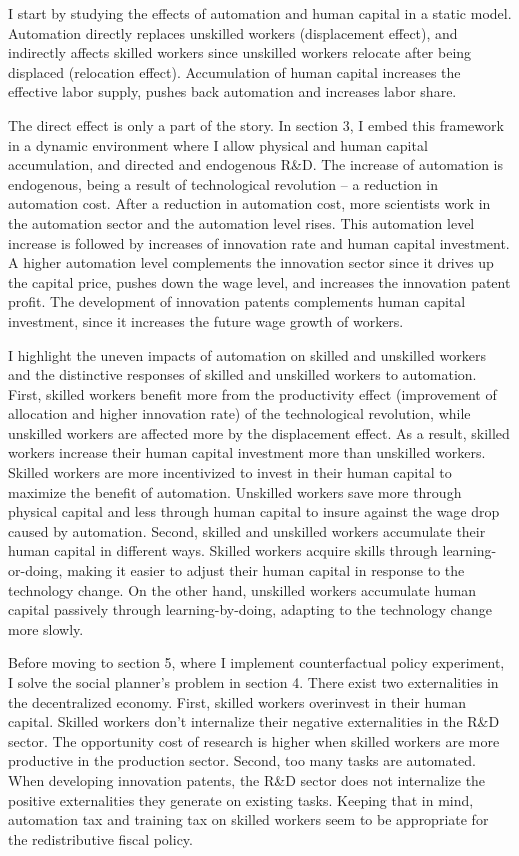 \documentclass[12pt]{article}
\begin{document}
I start by studying the effects of automation and human capital in a static model. Automation directly replaces unskilled workers (displacement effect), and indirectly affects skilled workers since unskilled workers relocate after being displaced (relocation effect). Accumulation of human capital increases the effective labor supply, pushes back automation and increases labor share. 

The direct effect is only a part of the story. In section 3, I embed this framework in a dynamic environment where I allow physical and human capital accumulation, and directed and endogenous R\&D. The increase of automation is endogenous, being a result of technological revolution -- a reduction in automation cost. After a reduction in automation cost, more scientists work in the automation sector and the automation level rises. This automation level increase is followed by increases of  innovation rate and human capital investment. A higher automation level complements the innovation sector since it drives up the capital price, pushes down the wage level, and increases the innovation patent profit. The development of innovation patents complements human capital investment, since it increases the future wage growth of workers. 

I highlight the uneven impacts of automation on skilled and unskilled workers and the distinctive responses of skilled and unskilled workers to automation. First, skilled workers benefit more from the productivity effect (improvement of allocation and higher innovation rate) of the technological revolution, while unskilled workers are affected more by the displacement effect. As a result, skilled workers increase their human capital investment more than unskilled workers. Skilled workers are more incentivized to invest in their human capital to maximize the benefit of automation. Unskilled workers save more through physical capital and less through human capital to insure against the wage drop caused by automation. Second, skilled and unskilled workers accumulate their human capital in different ways. Skilled workers acquire skills through learning-or-doing, making it easier to adjust their human capital in response to the technology change. On the other hand, unskilled workers accumulate human capital passively through learning-by-doing, adapting to the technology change more slowly.  

Before moving to section 5, where I implement counterfactual policy experiment, I solve the social planner's problem in section 4. There exist two externalities in the decentralized economy. First, skilled workers overinvest in their human capital. Skilled workers don't internalize their negative externalities in the R\&D sector. The opportunity cost of research is higher when skilled workers are more productive in the production sector. Second, too many tasks are automated. When developing innovation patents, the R\&D sector does not internalize the positive externalities they generate on existing tasks. Keeping that in mind, automation tax and training tax on skilled workers seem to be appropriate for the redistributive fiscal policy. 
\end{document}
